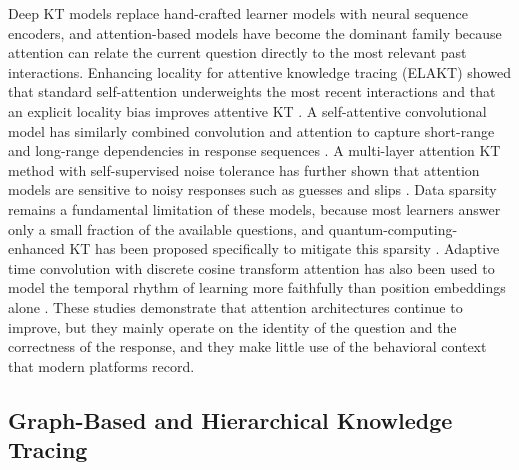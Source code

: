 \documentclass[11pt]{article}
\begin{document}
Deep KT models replace hand-crafted learner models with neural sequence encoders, and attention-based models have become the dominant family because attention can relate the current question directly to the most relevant past interactions. Enhancing locality for attentive knowledge tracing (ELAKT) showed that standard self-attention underweights the most recent interactions and that an explicit locality bias improves attentive KT \cite{pu2024elakt}. A self-attentive convolutional model has similarly combined convolution and attention to capture short-range and long-range dependencies in response sequences \cite{kia2024ackt}. A multi-layer attention KT method with self-supervised noise tolerance has further shown that attention models are sensitive to noisy responses such as guesses and slips \cite{wang2025multilayer}. Data sparsity remains a fundamental limitation of these models, because most learners answer only a small fraction of the available questions, and quantum-computing-enhanced KT has been proposed specifically to mitigate this sparsity \cite{bao2024quantum}. Adaptive time convolution with discrete cosine transform attention has also been used to model the temporal rhythm of learning more faithfully than position embeddings alone \cite{wang2025datckt}. These studies demonstrate that attention architectures continue to improve, but they mainly operate on the identity of the question and the correctness of the response, and they make little use of the behavioral context that modern platforms record.

\subsection{Graph-Based and Hierarchical Knowledge Tracing}
\end{document}
